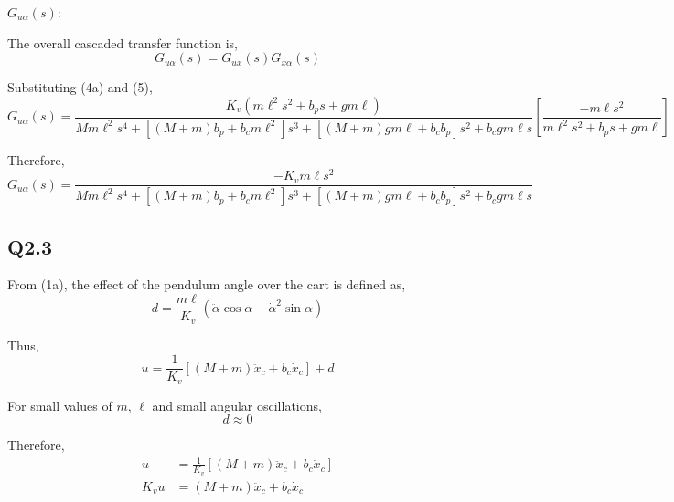 \documentclass[11pt,a4paper]{article}
\begin{document}
$G_{u\alpha}(s)$:

The overall cascaded transfer function is,
\begin{equation*}
    G_{u\alpha}(s) = G_{ux}(s) G_{x\alpha}(s)
\end{equation*}

Substituting (4a) and (5),
\begin{equation*}
    G_{u\alpha}(s) = \frac{ K_{v} \left( m \ell^{2} s^{2} + b_{p} s +g m \ell 
	\right)}{M m \ell^{2} s^{4} + \left[ \left( M + m \right) b_{p} + b_{c} 
	m \ell^{2} \right] s^{3} + \left[ \left( M + m \right) g m \ell + b_{c} 
	b_{p} \right] s^{2} + b_{c} g m \ell s} \left[ \frac{-m \ell s^{2}}
	{m \ell^{2} s^{2} + b_{p} s + g m \ell} \right]
\end{equation*}

Therefore,
\begin{equation}
    G_{u\alpha}(s) = \frac{-K_{v} m \ell s^{2}}{M m \ell^{2} s^{4}
    + \left[ \left( M + m \right) b_{p} + b_{c} m \ell^{2} \right] s^{3}
    + \left[ \left( M + m \right) g m \ell + b_{c} b_{p} \right]s^{2}
    + b_{c} g m \ell s} \tag{6}
\end{equation}

\subsection*{Q2.3}

From (1a), the effect of the pendulum angle over the cart is defined as,
\begin{equation*}
    d = \frac{ m \ell}{K_{v}} \left( \ddot{\alpha} \cos\alpha 
	- \dot{\alpha}^{2} \sin\alpha \right)
\end{equation*}

Thus,
\begin{equation*}
    u = \frac{1}{K_{v}} \left[ \left( M + m \right) \ddot{x}_{c}
    + b_{c} \dot{x}_{c} \right] + d
\end{equation*}

For small values of $m$, $\ell$ and small angular oscillations,
\begin{equation*}
    d \approx 0
\end{equation*}

Therefore,
\begin{align*}
    u &= \frac{1}{K_{v}} \left[ \left( M + m \right) \ddot{x}_{c}
    + b_{c} \dot{x}_{c} \right] \\
	K_{v}u &= \left( M + m \right) \ddot{x}_{c} + b_{c} \dot{x}_{c}
\end{align*}
\end{document}

